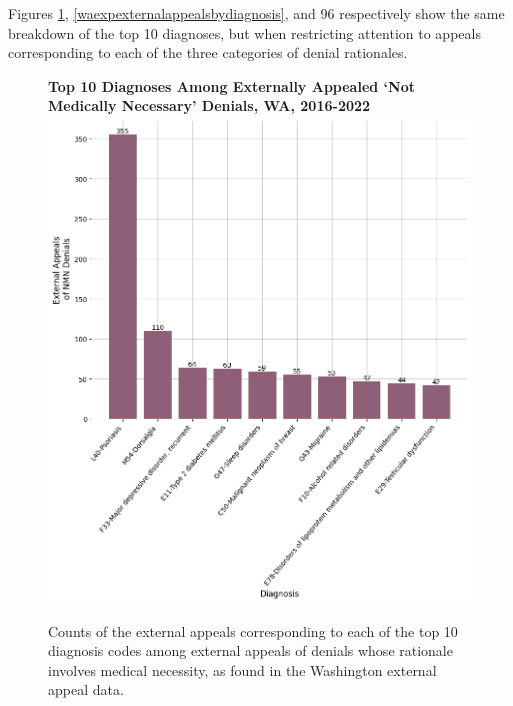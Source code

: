 \documentclass[12pt, a4paper,twoside]{report}
\theoremstyle{plain} %
\theoremstyle{definition} %
\theoremstyle{remark} %
\numberwithin{equation}{chapter}
\begin{document}
		Figures \ref{wanmnexternalappealsbydiagnosis}, \ref{waexpexternalappealsbydiagnosis}, and 96 respectively show the same breakdown of the top 10 diagnoses, but when restricting attention to appeals corresponding to each of the three categories of denial rationales.
		
		
		\begin{figure}[h!]
			\centering
			\textbf{Top 10 Diagnoses Among Externally Appealed `Not Medically Necessary' Denials, WA, 2016-2022}
			\includegraphics[width=.8\textwidth]{images/wa_external_appeals/top_nmn_appeal_diagnoses.png}
			\caption{Counts of the external appeals corresponding to each of the top 10 diagnosis codes among external appeals of denials whose rationale involves medical necessity, as found in the Washington external appeal data.}
			\label{wanmnexternalappealsbydiagnosis}
		\end{figure}
	
\end{document}
